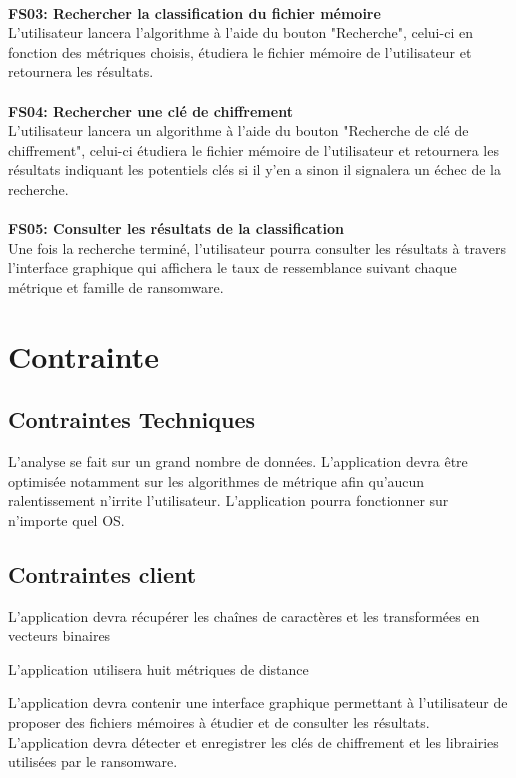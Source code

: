 \documentclass[a4paper, 12pt, twoside]{article}
\begin{document}
\paragraph{}
{\bfseries FS03: Rechercher la classification du fichier mémoire}\\
L'utilisateur lancera l'algorithme à l'aide du bouton "Recherche", celui-ci en fonction des métriques choisis, étudiera le fichier mémoire de l'utilisateur et retournera les résultats.
\paragraph{}
{\bfseries FS04: Rechercher une clé de chiffrement}\\
L'utilisateur lancera un algorithme à l'aide du bouton "Recherche de clé de chiffrement", celui-ci étudiera le fichier mémoire de l'utilisateur et retournera les résultats indiquant les potentiels clés si il y'en a sinon il signalera un échec de la recherche.
\paragraph{}
{\bfseries FS05: Consulter les résultats de la classification}\\
Une fois la recherche terminé, l'utilisateur pourra consulter les résultats à travers l'interface graphique qui affichera le taux de ressemblance suivant chaque métrique et famille de ransomware.
\section{Contrainte}
\subsection{Contraintes Techniques}
L’analyse se fait sur un grand nombre de données. L’application devra être optimisée notamment sur les algorithmes de métrique afin qu’aucun ralentissement n’irrite l’utilisateur. L’application pourra fonctionner sur n’importe quel OS.

\subsection{Contraintes client}
L’application devra récupérer les chaînes de caractères et les transformées en vecteurs binaires

L’application utilisera huit métriques de distance 

L’application devra contenir une interface graphique permettant à l’utilisateur de proposer des fichiers mémoires à étudier et de consulter les résultats.
L’application devra détecter et enregistrer les clés de chiffrement et les librairies utilisées par le ransomware.
\end{document}
